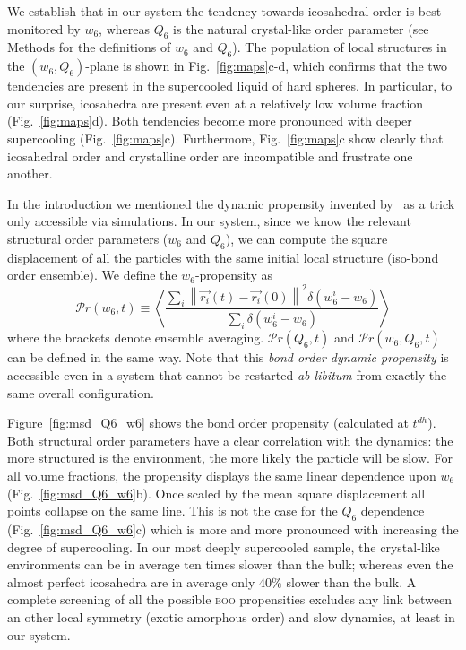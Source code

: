 We establish that in our system the tendency towards icosahedral order is best monitored by $w_6$, whereas $Q_6$ is the natural crystal-like order parameter (see Methods for the definitions of $w_6$ and $Q_6$). The population of local structures in the $(w_6,Q_6)$-plane is shown in Fig.~\ref{fig:maps}c-d, which confirms that the two tendencies are present in the supercooled liquid of hard spheres. In particular, to our surprise, icosahedra are present even at a relatively low volume fraction (Fig.~\ref{fig:maps}d). Both tendencies become more pronounced with deeper supercooling (Fig.~\ref{fig:maps}c). Furthermore, Fig.~\ref{fig:maps}c show clearly that icosahedral order and crystalline order are incompatible and frustrate one another.



In the introduction we mentioned the dynamic propensity invented by~\citet{Widmer-Cooper2005} as a trick only accessible via simulations. In our system, since we know the relevant structural order parameters ($w_6$ and $Q_6$), we can compute the square displacement of all the particles with the same initial local structure (iso-bond order ensemble). We define the $w_6$-propensity as
\begin{equation}
	\mathcal{P}r(w_6, t) \equiv \left\langle \frac{
		\sum\limits_i{
			\left\|\vec{r_i}(t)-\vec{r_i}(0)\right\|^2 \delta(w_6^i-w_6)
			}
	}{
		\sum\limits_i{\delta(w_6^i-w_6)}
	}\right\rangle 
	\label{eq:bo_propensity}
\end{equation}
where the brackets denote ensemble averaging. $\mathcal{P}r(Q_6, t)$ and $\mathcal{P}r(w_6, Q_6, t)$ can be defined in the same way. Note that this \emph{bond order dynamic propensity} is accessible even in a system that cannot be restarted \emph{ab libitum} from exactly the same overall configuration.

Figure~\ref{fig:msd_Q6_w6} shows the bond order propensity (calculated at $t^{dh}$). Both structural order parameters have a clear correlation with the dynamics: the more structured is the environment, the more likely the particle will be slow. For all volume fractions, the propensity displays the same linear dependence upon $w_6$ (Fig.~\ref{fig:msd_Q6_w6}b). Once scaled by the mean square displacement all points collapse on the same line. This is not the case for the $Q_6$ dependence (Fig.~\ref{fig:msd_Q6_w6}c) which is more and more pronounced with increasing the degree of supercooling. In our most deeply supercooled sample, the crystal-like environments can be in average ten times slower than the bulk; whereas even the almost perfect icosahedra are in average only $40\%$ slower than the bulk. A complete screening of all the possible \textsc{boo} propensities excludes any link between an other local symmetry (exotic amorphous order) and slow dynamics, at least in our system.

